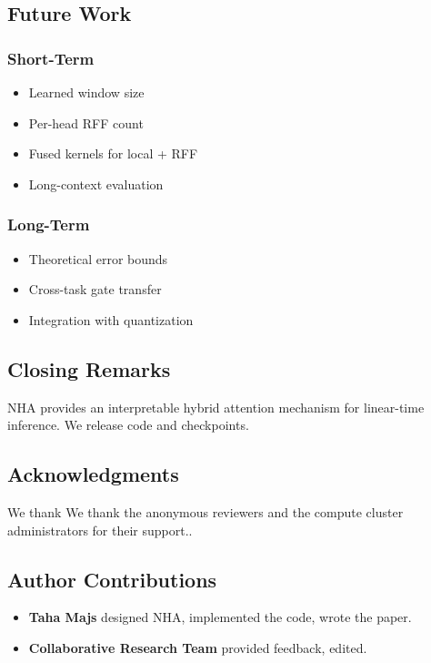 \subsection{Future Work}

\subsubsection{Short-Term}
\begin{itemize}
\item Learned window size
\item Per-head RFF count
\item Fused kernels for local + RFF
\item Long-context evaluation

\end{itemize}
\subsubsection{Long-Term}
\begin{itemize}
\item Theoretical error bounds
\item Cross-task gate transfer
\item Integration with quantization

\end{itemize}
\subsection{Closing Remarks}

NHA provides an interpretable hybrid attention mechanism for linear-time 
inference. We release code and checkpoints.

\subsection{Acknowledgments}

We thank We thank the anonymous reviewers and the compute cluster administrators for their support..

\subsection{Author Contributions}

\begin{itemize}
\item \textbf{Taha Majs} designed NHA, implemented the code, wrote the paper.
\item \textbf{Collaborative Research Team} provided feedback, edited.

\end{itemize}
